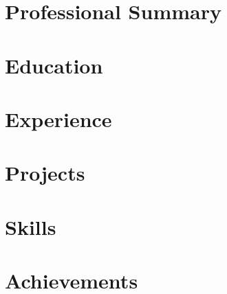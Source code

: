 \documentclass[a4paper]{article}
\begin{document}


\vspace{-2pt}
\section{Professional Summary}


\section{Education}
\resumeSubHeadingListStart

\resumeSubHeadingListEnd

\section{Experience}
\resumeSubHeadingListStart


\resumeSubHeadingListEnd

\section{Projects}
\projectSubheadingListStart







\projectSubheadingListEnd

\section{Skills}
\resumeSubHeadingListStart

\resumeSubHeadingListEnd

\section{Achievements}
\resumeSubHeadingListStart

\resumeSubHeadingListEnd
\end{document}
